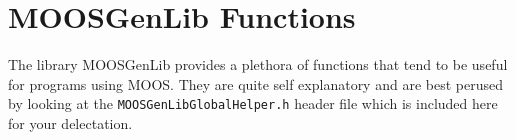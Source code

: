 \documentclass[a4paper,10pt]{article}
\newcommand{\Code}[1]{\texttt{#1} }
\newcommand{\code}[1]{\Code{#1} }
\begin{document}
\section{MOOSGenLib Functions}\label{Sec:MOOSGenLib}

The library MOOSGenLib provides a plethora of functions that tend
to be useful for programs using MOOS. They are quite self
explanatory and are best perused by looking at the
\code{MOOSGenLibGlobalHelper.h} header file which is included here
for your delectation. 
\end{document}
